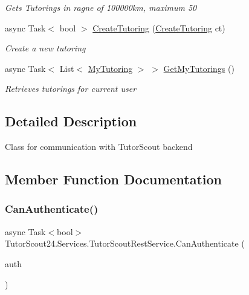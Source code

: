 \begin{DoxyCompactItemize}
\begin{DoxyCompactList}\small\item\em Gets Tutorings in ragne of 100000km, maximum 50 \end{DoxyCompactList}\item 
async Task$<$ bool $>$ \mbox{\hyperlink{class_tutor_scout24_1_1_services_1_1_tutor_scout_rest_service_a4cd967d7bd8115a9e856964b48ad427d}{Create\+Tutoring}} (\mbox{\hyperlink{class_tutor_scout24_1_1_models_1_1_tutorings_1_1_create_tutoring}{Create\+Tutoring}} ct)
\begin{DoxyCompactList}\small\item\em Create a new tutoring \end{DoxyCompactList}\item 
async Task$<$ List$<$ \mbox{\hyperlink{class_tutor_scout24_1_1_models_1_1_tutorings_1_1_my_tutoring}{My\+Tutoring}} $>$ $>$ \mbox{\hyperlink{class_tutor_scout24_1_1_services_1_1_tutor_scout_rest_service_a5171b947d8edb9279062e9af1f32e41f}{Get\+My\+Tutorings}} ()
\begin{DoxyCompactList}\small\item\em Retrieves tutorings for current user \end{DoxyCompactList}\end{DoxyCompactItemize}


\subsection{Detailed Description}
Class for communication with Tutor\+Scout backend 



\subsection{Member Function Documentation}
\mbox{\label{class_tutor_scout24_1_1_services_1_1_tutor_scout_rest_service_ad896af0129cadfceb66a35932bed7086}} 
\subsubsection{\texorpdfstring{Can\+Authenticate()}{CanAuthenticate()}}
{\footnotesize\ttfamily async Task$<$bool$>$ Tutor\+Scout24.\+Services.\+Tutor\+Scout\+Rest\+Service.\+Can\+Authenticate (\begin{DoxyParamCaption}\item[{\mbox{\hyperlink{class_tutor_scout24_1_1_models_1_1_user_data_1_1_check_authentication}{Check\+Authentication}}}]{auth }\end{DoxyParamCaption})\hspace{0.3cm}{\ttfamily [inline]}}



